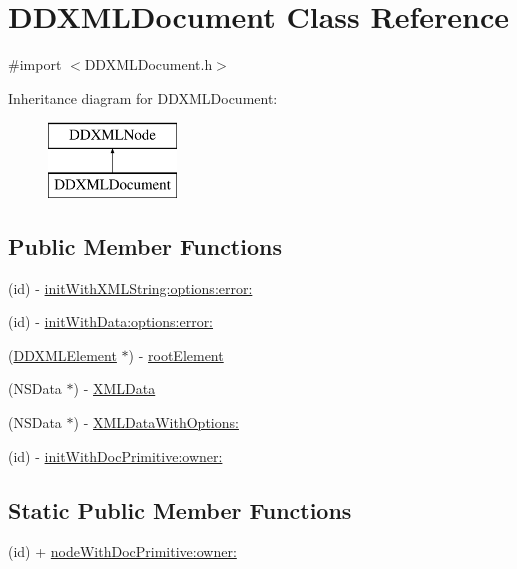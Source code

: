 \hypertarget{interface_d_d_x_m_l_document}{
\section{DDXMLDocument Class Reference}
\label{interface_d_d_x_m_l_document}
}


{\ttfamily \#import $<$DDXMLDocument.h$>$}

Inheritance diagram for DDXMLDocument:\begin{figure}[H]
\begin{center}
\leavevmode
\includegraphics[height=2cm]{interface_d_d_x_m_l_document}
\end{center}
\end{figure}
\subsection*{Public Member Functions}
\begin{DoxyCompactItemize}
\item 
(id) -\/ \hyperlink{interface_d_d_x_m_l_document_af23d56200d9ee753e86ce0b7cb55c39a}{initWithXMLString:options:error:}
\item 
(id) -\/ \hyperlink{interface_d_d_x_m_l_document_aad220c293e97e2f9d4606445672e0ff4}{initWithData:options:error:}
\item 
(\hyperlink{class_d_d_x_m_l_element}{DDXMLElement} $\ast$) -\/ \hyperlink{interface_d_d_x_m_l_document_aa052cb6b8b74bd92daf337e32afa2747}{rootElement}
\item 
(NSData $\ast$) -\/ \hyperlink{interface_d_d_x_m_l_document_add299b33a482e3f3847eb8a3f7fa3f99}{XMLData}
\item 
(NSData $\ast$) -\/ \hyperlink{interface_d_d_x_m_l_document_ad9a33564e109fc0864e6e717160e6d1b}{XMLDataWithOptions:}
\item 
(id) -\/ \hyperlink{interface_d_d_x_m_l_document_aaeed7c9531d8f43583b680d8ca69bf3e}{initWithDocPrimitive:owner:}
\end{DoxyCompactItemize}
\subsection*{Static Public Member Functions}
\begin{DoxyCompactItemize}
\item 
(id) + \hyperlink{interface_d_d_x_m_l_document_ab3dd88e49ab871b27b86ffd44e7aa8dc}{nodeWithDocPrimitive:owner:}
\end{DoxyCompactItemize}


